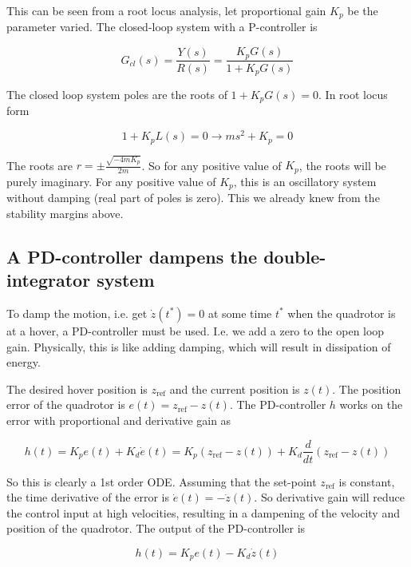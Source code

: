 \documentclass[a4paper]{report}
\begin{document}
This can be seen from a root locus analysis, let proportional gain $K_p$ be the parameter varied. 
The closed-loop system with a P-controller is

\begin{equation}
G_{cl}(s) = \frac{Y(s)}{R(s)} = \frac{K_p G(s)}{1 + K_p G(s)}
\end{equation}

The closed loop system poles are the roots of $1+K_p G(s) = 0$. In root locus form

\begin{equation}
1 + K_p L(s) = 0 \longrightarrow ms^2 + K_p = 0
\end{equation}

The roots are $r = \pm \frac{\sqrt{-4mK_p}}{2m}$. 
So for any positive value of $K_p$, the roots will be purely imaginary. 
For any positive value of $K_p$, this is an oscillatory system without damping (real part of poles is zero).
This we already knew from the stability margins above.


\subsection{A PD-controller dampens the double-integrator system}

To damp the motion, i.e. get $\dot{z}(t^*)=0$ at some time $t^*$ when the quadrotor is at a hover, a PD-controller must be used. 
I.e. we add a zero to the open loop gain.
Physically, this is like adding damping, which will result in dissipation of energy.

The desired hover position is $z_\text{ref}$ and the current position is $z(t)$. The position error of the quadrotor is $e(t)=z_\text{ref} - z(t)$.
The PD-controller $h$ works on the error with proportional and derivative gain as

\begin{equation} \label{eq:PD_1d_verbose}
h(t) = K_p e(t) + K_d \dot{e}(t) = K_p ( z_\text{ref} - z(t) ) + K_d \frac{d}{dt}( z_\text{ref} - z(t) )
\end{equation}

So this is clearly a 1st order \gls{ODE}. Assuming that the set-point $z_\text{ref}$ is constant, the time derivative of the error is $\dot{e}(t) = -\dot{z}(t)$. So derivative gain will reduce the control input at high velocities, resulting in a dampening of the velocity and position of the quadrotor.
The output of the PD-controller is

\begin{equation} \label{eq:PD_1d_simple}
h(t) = K_p e(t) - K_d \dot{z}(t)
\end{equation}
\end{document}
